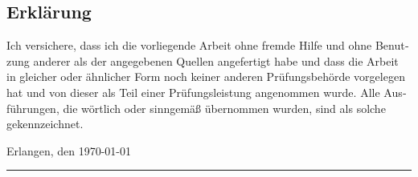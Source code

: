 \begin{otherlanguage}{german}
\chapter*{Erklärung}
\thispagestyle{empty}
Ich versichere, dass ich die vorliegende Arbeit ohne fremde Hilfe und ohne Benutzung anderer als
der angegebenen Quellen angefertigt habe und dass die Arbeit in gleicher oder
ähnlicher Form noch keiner anderen Prüfungsbehörde vorgelegen hat und von dieser
als Teil einer Prüfungsleistung angenommen wurde. Alle Ausführungen, die
wörtlich oder sinngemäß übernommen wurden, sind als solche gekennzeichnet.\\
\vspace{2cm}

Erlangen, den \today\\[-5mm]
\hspace*{9cm}\rule[-0.3pt]{0.35\linewidth}{0.4pt}\\[0mm]
\hspace*{10.4cm}\NAME

\end{otherlanguage}
\newpage
\thispagestyle{empty}
\mbox{ }
\newpage